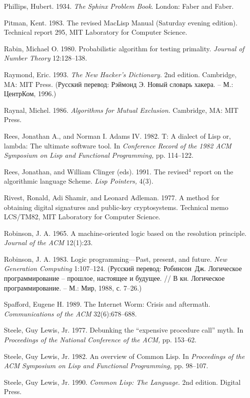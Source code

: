 {Phillips, Hubert.  1934. {\em The Sphinx Problem Book}.  London: Faber
and Faber.

Pitman, Kent.  1983.  The revised MacLisp Manual (Saturday evening
edition).  Technical report 295, MIT Laboratory for Computer Science.

Rabin, Michael O. 1980. Probabilistic algorithm for testing primality.
{\em Journal of Number Theory} 12:128--138.

Raymond, Eric.  1993. {\em The New Hacker's Dictionary.} 2nd edition.
Cambridge, MA: MIT Press. (Русский перевод: Рэймонд Э.  Новый словарь
хакера. -- М.: ЦентрКом, 1996.)

Raynal, Michel. 1986. {\em Algorithms for Mutual Exclusion.}
Cambridge, MA: MIT Press.

Rees, Jonathan A., and Norman I. Adams IV. 1982.  T: A dialect of Lisp
or, lambda: The ultimate software tool.  In {\em Conference Record of
the 1982 ACM Symposium on Lisp and Functional Programming,} pp.
114--122.

Rees, Jonathan, and William Clinger (eds). 1991.  The revised$^4$
report on the algorithmic language Scheme.  {\em Lisp Pointers,} 4(3).

Rivest, Ronald, Adi Shamir, and Leonard Adleman.  1977.  A method for
obtaining digital signatures and public-key cryptosystems. Technical
memo LCS/TM82, MIT Laboratory for Computer Science.

Robinson, J. A. 1965.  A machine-oriented logic based on the
resolution principle.  {\em Journal of the ACM} 12(1):23.

Robinson, J. A. 1983.  Logic programming---Past, present, and future.
{\em New Ge\-ne\-ra\-tion Computing} 1:107--124. (Русский перевод:
Робинсон~Дж.  Логическое программирование -- прошлое, настоящее и
будущее.  // В кн. Логическое программирование. -- М.: Мир, 1988, с. 7--26.)

Spafford, Eugene H.  1989.  The Internet Worm: Crisis and aftermath.
{\em Com\-mu\-ni\-ca\-tions of the ACM} 32(6):678--688.

Steele, Guy Lewis, Jr.  1977.  Debunking the ``expensive procedure
call'' myth.  In {\em Proceedings of the National Conference of the
ACM,} pp. 153--62.

Steele, Guy Lewis, Jr.  1982.  An overview of Common Lisp.  In {\em Proceedings of the ACM Symposium on Lisp and Functional Programming,}
pp. 98--107.

Steele, Guy Lewis, Jr.  1990.  {\em Common Lisp: The Language.} 2nd
edition.  Digital Press.

}
